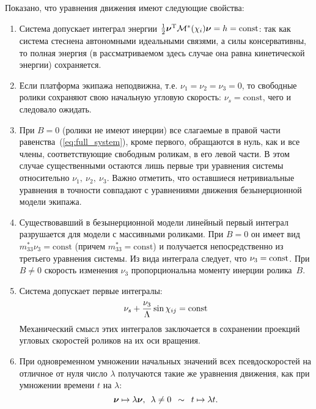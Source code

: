 Показано, что уравнения движения имеют следующие свойства:
\begin{enumerate}[wide]
    \item Система допускает интеграл энергии $\frac{1}{2}\boldsymbol{\mathbf{\nu}}^\mathrm{T}\mathcal{M}^*(\chi_i)\boldsymbol{\mathbf{\nu}} = h = \mathrm{const}$: так как система стеснена автономными идеальными связями, а силы консервативны, то полная энергия (в рассматриваемом здесь случае она равна кинетической энергии) сохраняется.
    
    \item Если платформа экипажа неподвижна, т.е. $\nu_1 = \nu_2 = \nu_3 = 0$, то свободные ролики сохраняют свою начальную угловую скорость: $\nu_s = \mathrm{const}$, чего и следовало ожидать.
   
    \item При $B = 0$ (ролики не имеют инерции) все слагаемые в правой части равенства~(\ref{eq:full_system}), кроме первого, обращаются в нуль, как и все члены, соответствующие свободным роликам, в его левой части. В этом случае существенными остаются лишь первые три уравнения системы относительно $\nu_1,\ \nu_2,\ \nu_3$. Важно отметить, что оставшиеся нетривиальные уравнения в точности совпадают с уравнениями движения безынерционной модели экипажа.
    \item Существовавший в безынерционной модели линейный первый интеграл разрушается для модели с массивными роликами. При $B = 0$ он имеет вид $m_{33}^*\nu_3 = \mathrm{const}$ (причем $m^*_{33} = \mathrm{const}$) и получается непосредственно из третьего уравнения системы. Из вида интеграла следует, что $\nu_3 = \mathrm{const}$. При $B \neq 0$ скорость изменения $\nu_3$ пропорциональна моменту инерции ролика~$B$.
    \item Система допускает первые интегралы:
    \begin{equation}\label{int_free_roller}
        \nu_s + \displaystyle\frac{\displaystyle \nu_3}{\displaystyle \Lambda}\sin\chi_{ij} = \mathrm{const}
    \end{equation}
    Механический смысл этих интегралов заключается в сохранении проекций угловых скоростей роликов на их оси вращения.
    \item При одновременном умножении начальных значений всех псевдоскоростей на отличное от нуля число $\lambda$ получаются такие же уравнения движения, как при умножении времени $t$ на $\lambda$:
    $$
        \boldsymbol{\mathbf{\nu}} \mapsto \lambda\boldsymbol{\mathbf{\nu}}, \enspace \lambda \neq 0 \enspace \sim \enspace t \mapsto \lambda t.
    $$
\end{enumerate}